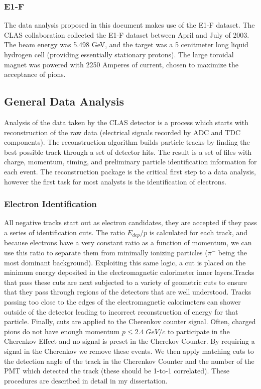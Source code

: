 \subsubsection{E1-F}
The data analysis proposed in this document makes use of the E1-F dataset.  The CLAS collaboration collected the E1-F dataset between April and July of 2003.  The beam energy was 5.498 GeV, and the target was a 5 cenitmeter long liquid hydrogen cell (providing essentially stationary protons).  The large toroidal magnet was powered with 2250 Amperes of current, chosen to maximize the acceptance of pions.

\subsection{General Data Analysis}
Analysis of the data taken by the CLAS detector is a process which starts with reconstruction of the raw data (electrical signals recorded by ADC and TDC components).  The reconstruction algorithm builds particle tracks by finding the best possible track through a set of detector hits.  The result is a set of files with charge, momentum, timing, and preliminary particle identification information for each event.  The reconstruction package is the critical first step to a data analysis, however the first task for most analysts is the identification of electrons.

\subsubsection{Electron Identification}
All negative tracks start out as electron candidates, they are accepted if they pass a series of identification cuts. The ratio $E_{dep}/p$ is calculated for each track, and because electrons have a very constant ratio as a function of momentum, we can use this ratio to separate them from minimally ionizing particles ($\pi^{-}$ being the most dominant background).  Exploiting this same logic, a cut is placed on the minimum energy deposited in the electromagnetic calorimeter inner layers.Tracks that pass these cuts are next subjected to a variety of geometric cuts to ensure that they pass through regions of the detectors that are well understood.  Tracks passing too close to the edges of the electromagnetic calorimeters can shower outside of the detector leading to incorrect reconstruction of energy for that particle.  Finally, cuts are applied to the Cherenkov counter signal.  Often, charged pions do not have enough momentum $p \leq 2.4 \; GeV/c$ to participate in the Cherenkov Effect and no signal is preset in the Cherekov Counter.  By requiring a signal in the Cherenkov we remove these events.  We then apply matching cuts to the detection angle of the track in the Cherenkov Counter and the number of the PMT which detected the track (these should be 1-to-1 correlated).  These procedures are described in detail in my dissertation.

